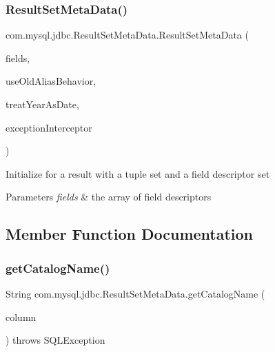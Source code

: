\subsubsection{\texorpdfstring{Result\+Set\+Meta\+Data()}{ResultSetMetaData()}}
{\footnotesize\ttfamily com.\+mysql.\+jdbc.\+Result\+Set\+Meta\+Data.\+Result\+Set\+Meta\+Data (\begin{DoxyParamCaption}\item[{\mbox{\hyperlink{classcom_1_1mysql_1_1jdbc_1_1_field}{Field}} \mbox{[}$\,$\mbox{]}}]{fields,  }\item[{boolean}]{use\+Old\+Alias\+Behavior,  }\item[{boolean}]{treat\+Year\+As\+Date,  }\item[{\mbox{\hyperlink{interfacecom_1_1mysql_1_1jdbc_1_1_exception_interceptor}{Exception\+Interceptor}}}]{exception\+Interceptor }\end{DoxyParamCaption})}

Initialize for a result with a tuple set and a field descriptor set


\begin{DoxyParams}{Parameters}
{\em fields} & the array of field descriptors \\
\hline
\end{DoxyParams}


\subsection{Member Function Documentation}
\mbox{\label{classcom_1_1mysql_1_1jdbc_1_1_result_set_meta_data_ac2f12bbb6c31b08fd76a5a7a76801542}} 
\subsubsection{\texorpdfstring{get\+Catalog\+Name()}{getCatalogName()}}
{\footnotesize\ttfamily String com.\+mysql.\+jdbc.\+Result\+Set\+Meta\+Data.\+get\+Catalog\+Name (\begin{DoxyParamCaption}\item[{int}]{column }\end{DoxyParamCaption}) throws S\+Q\+L\+Exception}

